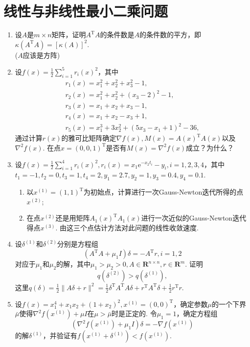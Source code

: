 \section{线性与非线性最小二乘问题}
\begin{enumerate}
    \item 设$A$是$m \times n$矩阵，证明$A^{\mathrm{T}}A$的条件数是$A$的条件数的平方，即$\kappa(A^{\mathrm{T}}A)=[\kappa(A)]^2$.\\
    \omitted ($A$应该是方阵)
    \item 设$\displaystyle f(x)=\frac{1}{2}\sum_{i=1}^5 r_i(x)^2$，其中
    \[\begin{array}{ll}
        r_1(x)=x_1^2+x_2^2+x_3^2-1,\\
        r_2(x)=x_1^2+x_2^2+(x_3-2)^2-1,\\
        r_3(x)=x_1+x_2+x_3-1,\\
        r_4(x)=x_1+x_2-x_3+1,\\
        r_5(x)=x_1^3+3x_2^2+(5x_3-x_1+1)^2-36,
    \end{array}\]
    通过计算$r(x)$的雅可比矩阵确定$\nabla f(x),M(x)=A(x)^{\mathrm{T}}A(x)$以及$\nabla^2f(x)$. 在点$x=(0,0,1)^{\mathrm{T}}$是否有$M(x)=\nabla^2f(x)$成立？为什么？\\
    \omitted
    \item 设$\displaystyle f(x)=\frac{1}{2}\sum_{i=1}^4 r_i(x)^2,r_i(x)=x_1\mathrm{e}^{-x_2t_i}-y_i,i=1,2,3,4$，其中$t_1=-1,t_2=0,t_3=1,t_4=2,y_1=2.7,y_2=1,y_3=0.4,y_4=0.1$.
    \begin{enumerate}[label=(\arabic*)]
        \item 以$x^{(1)}=(1,1)^{\mathrm{T}}$为初始点，计算进行一次Gauss-Newton迭代所得的点$x^{(2)}$;
        \item 在点$x^{(2)}$还是用矩阵$A_1(x)^{\mathrm{T}}A_1(x)$进行一次近似的Gauss-Newton迭代得点$x^{(3)}$. 由这三个点估计方法对此问题的线性收敛速度.
    \end{enumerate}
    \omitted
    \item 设$\delta^{(1)}$和$\delta^{(2)}$分别是方程组\[(A^{\mathrm{T}}A+\mu_1I)\delta=-A^{\mathrm{T}}r,i=1,2\]对应于$\mu_1$和$\mu_2$的解，其中$\mu_1>\mu_2>0,A \in \textbf{R}^{n \times n}, r \in \textbf{R}^m$. 证明\[q(\delta^{(2)})>q(\delta^{(1)}),\]这里$\displaystyle q(\delta)=\frac{1}{2}\|A\delta+r\|^2=\frac{1}{2}\delta^{\mathrm{T}} A^{\mathrm{T}} A \delta+r^{\mathrm{T}} A^{\mathrm{T}} \delta+\frac{1}{2}r^{\mathrm{T}} r$.\\
    \omitted
    \item 设$f(x)=x_1^4+x_1x_2+(1+x_2)^2,x^{(1)}=(0,0)^{\mathrm{T}}$，确定参数$\mu$的一个下界$\bar{\mu}$使得$\nabla^2 f(x^{(1)})+\mu I$在$\mu>\bar{\mu}$时是正定的. 令$\mu_1=1$，确定方程组\[(\nabla^2 f(x^{(1)})+\mu_1 I)\delta = -\nabla f(x^{(1)})\]的解$\delta^{(1)}$，并验证有$f(x^{(1)}+\delta^{(1)})<f(x^{(1)})$.\\

\end{enumerate}
